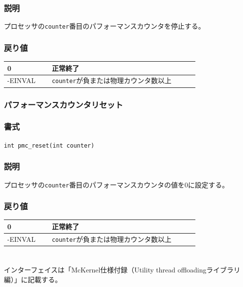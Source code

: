 \documentclass[twoside,11pt,fleqn]{book}
\begin{document}
{\subsubsection*{説明}{\quad}
プロセッサの\texttt{counter}番目のパフォーマンスカウンタを停止する。

\subsubsection*{戻り値}
\begin{table}[!h]
\footnotesize
\begin{tabular}{|p{0.20\linewidth}|p{0.66\linewidth}|} \hline
0&正常終了\\ \hline
-EINVAL&\texttt{counter}が負または物理カウンタ数以上\\ \hline
\end{tabular}
\vspace{-0em}
\end{table}
\FloatBarrier

\subsubsection{パフォーマンスカウンタリセット}
\subsubsection*{書式}{\quad} \texttt{int pmc\_reset(int counter)}
\subsubsection*{説明}{\quad}
プロセッサの\texttt{counter}番目のパフォーマンスカウンタの値を0に設定する。

\subsubsection*{戻り値}
\begin{table}[!h]
\footnotesize
\begin{tabular}{|p{0.20\linewidth}|p{0.66\linewidth}|} \hline
0&正常終了\\ \hline
-EINVAL&\texttt{counter}が負または物理カウンタ数以上\\ \hline
\end{tabular}
\vspace{-0em}
\end{table}
\FloatBarrier
}
\section{}\label{sec:uti_libif}
インターフェイスは「McKernel仕様付録（Utility thread offloadingライブラリ編）」に記載する。
\end{document}
